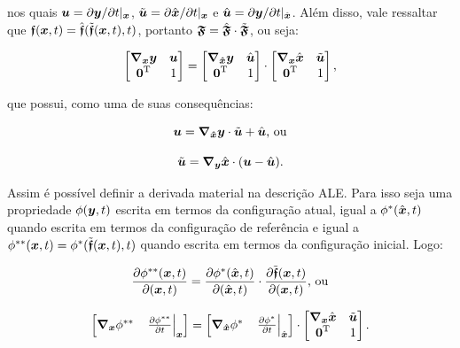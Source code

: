 \noindent nos quais $\boldsymbol{u}=\partial\boldsymbol{y}/\partial t|_{\boldsymbol{x}}$, $\tilde{\boldsymbol{u}}=\partial\hat{\boldsymbol{x}}/\partial t|_{\boldsymbol{x}}$ e $\hat{\boldsymbol{u}}=\partial\boldsymbol{y}/\partial t|_{\hat{\boldsymbol{x}}}$. Além disso, vale ressaltar que $\boldsymbol{\mathfrak{f}}(\boldsymbol{x},t)=\hat{\boldsymbol{\mathfrak{f}}}(\tilde{\boldsymbol{\mathfrak{f}}}(\boldsymbol{x},t),t)$, portanto $\boldsymbol{\mathfrak{F}}=\hat{\boldsymbol{\mathfrak{F}}}\cdot\tilde{\boldsymbol{\mathfrak{F}}}$, ou seja:

\begin{equation}
    \begin{bmatrix}\Nx\BB{y}&\BB{u}\\\BB{0}\trans&1\end{bmatrix}=
    \begin{bmatrix}\Nxh\BB{y}&\uhat\\\BB{0}\trans&1\end{bmatrix}\cdot
    \begin{bmatrix}\Nx\HBB{x}&\tilde{\BB{u}}\\\BB{0}\trans&1\end{bmatrix}\text{,}
    \label{F4}
\end{equation}

\noindent que possui, como uma de suas consequências:

\begin{equation}
    \BB{u}=\Nxh\BB{y}\cdot\tilde{\BB{u}}+\uhat\text{, ou}
    \label{u1}
\end{equation}

\begin{equation}
    \tilde{\BB{u}}=\Ny\HBB{x}\cdot(\BB{u}-\uhat)\text{.}
    \label{w1}
\end{equation}

Assim é possível definir a derivada material na descrição ALE. Para isso seja uma propriedade $\phi(\boldsymbol{y},t)$ escrita em termos da configuração atual, igual a $\phi^*(\hat{\boldsymbol{x}},t)$ quando escrita em termos da configuração de referência e igual a $\phi^{**}(\boldsymbol{x},t)=\phi^*(\tilde{\boldsymbol{\mathfrak{f}}}(\boldsymbol{x},t),t)$ quando escrita em termos da configuração inicial. Logo:


\begin{equation}
    \der{\phi^{**}(\BB{x},t)}{(\BB{x},t)}=\der{\phi^*(\HBB{x},t)}{(\HBB{x},t)}\cdot\der{\tfmc(\BB{x},t)}{(\BB{x},t)}\text{, ou}
    \label{phi1}
\end{equation}

\begin{equation}
    \begin{bmatrix}\Nx\phi^{**}&\dTimex{\phi^{**}}\end{bmatrix}=
    \begin{bmatrix}\Nxh\phi^{*}&\dTimexh{\phi^{*}}\end{bmatrix}\cdot
    \begin{bmatrix}\Nx\HBB{x}&\tilde{\BB{u}}\\\BB{0}\trans&1\end{bmatrix}
    \text{.}
    \label{phi2}
\end{equation}

